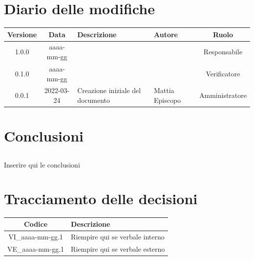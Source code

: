 \documentclass[12pt, a4paper,table]{article}
\begin{document}
	\section*{Diario delle modifiche}
	\begin{center}
	\renewcommand{\arraystretch}{1.8} %
	\begin{tabular}{ |c|c|m{12em}|m{7em}|c| }
	\hline
	\textbf{Versione} & \textbf{Data} & \textbf{Descrizione} &  \textbf{Autore} &  \textbf{Ruolo} \\
	\hline
	1.0.0 & aaaa-mm-gg &  & \docApprovazione & Responsabile\\ %
	\hline
	0.1.0 & aaaa-mm-gg &  & \docVerificatori & Verificatore\\ %
	\hline
    	0.0.1 & 2022-03-24 & Creazione iniziale del documento & Mattia \newline Episcopo & Amministratore\\  %
	\hline
	\end{tabular}
	\end{center}
	\newpage
	
	\tableofcontents
	\newpage
	
	\newpage
	
	\newpage
		
	\newpage
	
	\newpage
	\section{Conclusioni}
	    \subsection {} Inserire qui le conclusioni
	\newpage
	
	\section*{Tracciamento delle decisioni}
	\renewcommand{\arraystretch}{1.8} %
	\begin{tabular}{ |c|l| }
		\hline
		\textbf{Codice} & \textbf{Descrizione} \\
		\hline
		VI\_aaaa-mm-gg.1 & Riempire qui se verbale interno\\ \hline
		VE\_aaaa-mm-gg.1 & Riempire qui se verbale esterno\\ \hline
	\end{tabular}
\end{document}
